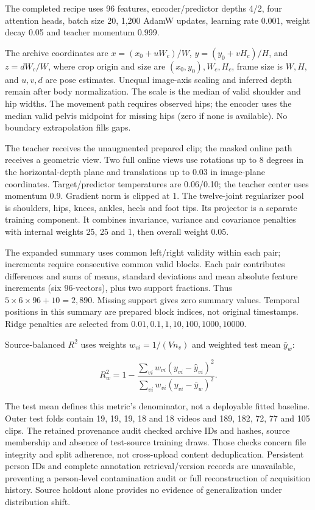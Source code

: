 \documentclass{article}
\begin{document}
The completed recipe uses 96 features, encoder/predictor depths 4/2,
four attention heads, batch size 20, 1,200 AdamW updates, learning rate
0.001, weight decay 0.05 and teacher momentum 0.999.

The archive coordinates are \(x=(x_0+uW_c)/W\), \(y=(y_0+vH_c)/H\), and
\(z=dW_c/W\), where crop origin and size are \((x_0,y_0),W_c,H_c\),
frame size is \(W,H\), and \(u,v,d\) are pose estimates. Unequal
image-axis scaling and inferred depth remain after body normalization.
The scale is the median of valid shoulder and hip widths. The movement
path requires observed hips; the encoder uses the median valid pelvis
midpoint for missing hips (zero if none is available). No boundary
extrapolation fills gaps.

The teacher receives the unaugmented prepared clip; the masked online
path receives a geometric view. Two full online views use rotations up
to 8 degrees in the horizontal-depth plane and translations up to 0.03
in image-plane coordinates. Target/predictor temperatures are 0.06/0.10;
the teacher center uses momentum 0.9. Gradient norm is clipped at 1. The
twelve-joint regularizer pool is shoulders, hips, knees, ankles, heels
and foot tips. Its projector is a separate training component. It
combines invariance, variance and covariance penalties with internal
weights 25, 25 and 1, then overall weight 0.05.

The expanded summary uses common left/right validity within each pair;
increments require consecutive common valid blocks. Each pair
contributes differences and sums of means, standard deviations and mean
absolute feature increments (six 96-vectors), plus two support
fractions. Thus \(5\times6\times96+10=2,890\). Missing support gives
zero summary values. Temporal positions in this summary are prepared
block indices, not original timestamps. Ridge penalties are selected
from \(0.01,0.1,1,10,100,1000,10000\).

Source-balanced \(R^2\) uses weights \(w_{vi}=1/(Vn_v)\) and weighted
test mean \(\bar y_w\):

\[R_w^2=1-\frac{\sum_{vi}w_{vi}(y_{vi}-\hat y_{vi})^2}{\sum_{vi}w_{vi}(y_{vi}-\bar y_w)^2}.\]

The test mean defines this metric's denominator, not a deployable fitted
baseline. Outer test folds contain 19, 19, 19, 18 and 18 videos and 189,
182, 72, 77 and 105 clips. The retained provenance audit checked archive
IDs and hashes, source membership and absence of test-source training
draws. Those checks concern file integrity and split adherence, not
cross-upload content deduplication. Persistent person IDs and complete
annotation retrieval/version records are unavailable, preventing a
person-level contamination audit or full reconstruction of acquisition
history. Source holdout alone provides no evidence of generalization
under distribution shift.
\end{document}
